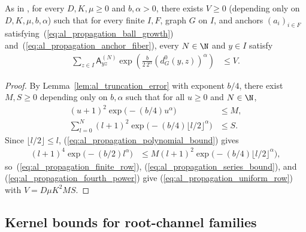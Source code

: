 \begin{lemma}
    \label{thm:al_graph_kernel_uniform_row}
    \leanok
    As in \cite[Section~10]{OpenAI2026AreaLaw}, for every $D,K,\mu\ge0$ and
    $b,\alpha>0$, there exists $V\ge0$ (depending only on $D,K,\mu,b,\alpha$)
    such that for every finite $I,F$, graph $G$ on $I$, and anchors
    $(a_i)_{i\in F}$ satisfying~(\ref{eq:al_propagation_ball_growth})
    and~(\ref{eq:al_propagation_anchor_fiber}), every $N\in\N$ and $y\in I$
    satisfy
    \begin{align}
        \label{eq:al_propagation_uniform_row}
        \sum_{z\in I}\mathsf A^{(N)}_{yz}
        \exp\left(\frac{b}{2\,2^\alpha}(d_G^0(y,z))^\alpha\right)
         & \le V.
    \end{align}
\end{lemma}
\begin{proof}
    \leanok
    By Lemma~\ref{lem:al_truncation_error} with exponent $b/4$, there exist
    $M,S\ge0$ depending only on $b,\alpha$ such that for all $u\ge0$ and
    $N\in\N$,
    \begin{align}
        \label{eq:al_propagation_polynomial_bound}
        (u+1)^2\exp\bigl(-(b/4)u^\alpha\bigr)           & \le M, \\
        \label{eq:al_propagation_series_bound}
        \sum_{l=0}^{N}(l+1)^2
        \exp\bigl(-(b/4)\lfloor l/2\rfloor^\alpha\bigr) & \le S.
    \end{align}
    Since $\lfloor l/2\rfloor\le l$,
    (\ref{eq:al_propagation_polynomial_bound}) gives
    \begin{align}
        \label{eq:al_propagation_fourth_power}
        (l+1)^4\exp\bigl(-(b/2)l^\alpha\bigr)
         & \le M(l+1)^2\exp\bigl(-(b/4)\lfloor l/2\rfloor^\alpha\bigr),
    \end{align}
    so~(\ref{eq:al_propagation_finite_row}),
    (\ref{eq:al_propagation_series_bound}), and
    (\ref{eq:al_propagation_fourth_power}) give
    (\ref{eq:al_propagation_uniform_row}) with $V=D\mu K^2MS$.
\end{proof}

\subsection{Kernel bounds for root-channel families}

